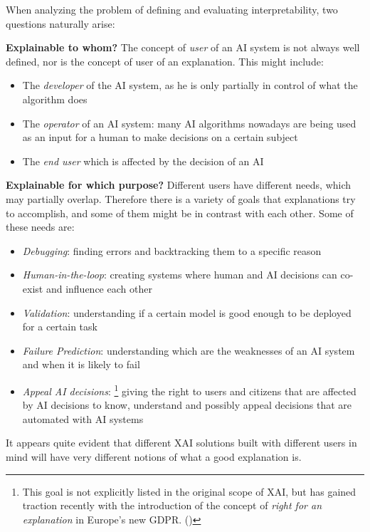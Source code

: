 \documentclass[conference]{IEEEtran}
\begin{document}
When analyzing the problem of defining and evaluating interpretability, two
questions naturally arise:

\textbf{Explainable to whom?} The concept of \textit{user} of an AI system is
not always well defined, nor is the concept of user of an explanation. This
might include:

\begin{itemize}
    \item The \textit{developer} of the AI system, as he is only partially in
          control of what the algorithm does
    \item The \textit{operator} of an AI system: many AI algorithms nowadays are
          being used as an input for a human to make decisions on a certain
          subject
    \item The \textit{end user} which is affected by the decision of an AI
\end{itemize}

\textbf{Explainable for which purpose?} Different users have different needs,
which may partially overlap. Therefore there is a variety of goals that
explanations try to accomplish, and some of them might be in contrast with each
other. Some of these needs are:
\begin{itemize}
    \item \textit{Debugging}: finding errors and backtracking them to a specific
          reason
    \item \textit{Human-in-the-loop}: creating systems where human and AI
          decisions can co-exist and influence each other
    \item \textit{Validation}: understanding if a certain model is good enough
          to be deployed for a certain task
    \item \textit{Failure Prediction}: understanding which are the weaknesses of
          an AI system and when it is likely to fail
    \item \textit{Appeal AI decisions}: \footnote{This goal is not explicitly
              listed in the original scope of XAI, but has gained traction
              recently with the introduction of the concept of \textit{right for
                  an explanation} in Europe's new GDPR. (\citet{righttoexpl})}
          giving the right to users and citizens that are affected by AI
          decisions to know, understand and possibly appeal decisions that
          are automated with AI systems
\end{itemize}

It appears quite evident that different XAI solutions built with different users
in mind will have very different notions of what a good explanation is.
\end{document}
